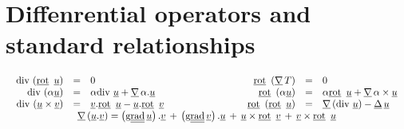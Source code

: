 \section{Diffenrential operators and standard relationships}
\begin{equation*}
\begin{array}{c}
%
\begin{array}{r c l @{\hspace{3cm}} r c l }
\dive \left(  \rot \, \vect{u}\right) &=&0  &
\rot  \left(  \gradv \, T\right)  &=&0 \\
\dive \left( \alpha  \vect{u} \right) &=& \alpha \dive \, \vect{u} + \gradv \, \alpha . \vect{u}  &
\rot \left( \alpha  \vect{u} \right) &=& \alpha \rot \, \vect{u} + \gradv \, \alpha  \times  \vect{u} \\
\dive \left(   \vect{u} \times \vect{v} \right) &=& \vect{v}. \rot \, \vect{u} - \vect{u} . \rot \, \vect{v} &
\rot \left( \rot \, \vect{u} \right) & = & \grad \left( \dive \, \vect{u} \right)  - \vect{\Delta } \, \vect{u}
\end{array}
\\
\grad \left( \vect{u}. \vect{v} \right) = \left( \ggrad  \vect{u} \right) . \vect{v}  \, + \,  \left( \ggrad  \vect{v} \right) . \vect{u} \, + \, \vect{u} \times \rot \, \vect{v}
\, + \,  \vect{v} \times \rot \, \vect{u} \\
\end{array}
\end{equation*}
%
%
%
\newpage
